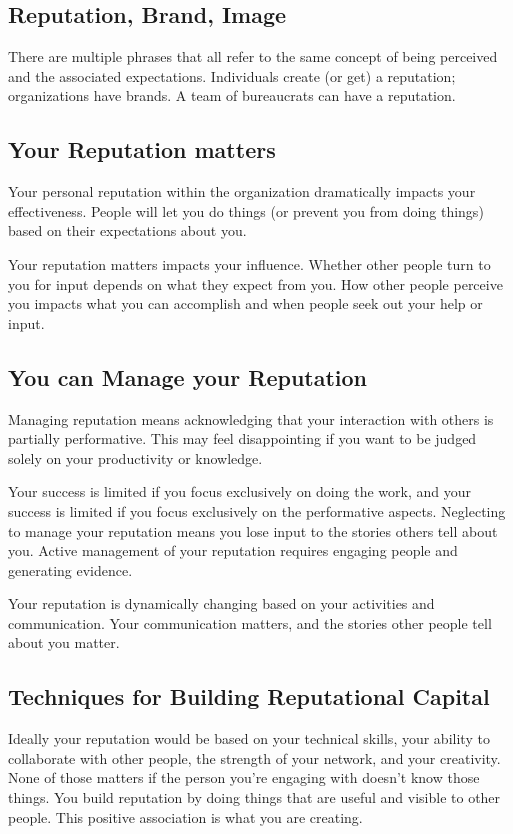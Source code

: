 \subsection*{Reputation, Brand, Image}

There are multiple phrases that all refer to the same concept of being perceived and the associated expectations. Individuals create (or get) a reputation; organizations have brands. A team of bureaucrats can have a reputation. 

\subsection*{Your Reputation matters}

Your personal reputation within the organization dramatically impacts your effectiveness. People will let you do things (or prevent you from doing things) based on their expectations about you. 

Your reputation matters impacts your influence. Whether other people turn to you for input depends on what they expect from you. How other people perceive you impacts what you can accomplish and when people seek out your help or input.

\subsection*{You can Manage your Reputation}

Managing reputation means acknowledging that your interaction with others is partially performative. This may feel disappointing if you want to be judged solely on your productivity or knowledge. 

Your success is limited if you focus exclusively on doing the work, and your success is limited if you focus exclusively on the performative aspects. 
Neglecting to manage your reputation means you lose input to the stories others tell about you. Active management of your reputation requires engaging people and generating evidence. 

Your reputation is dynamically changing based on your activities and communication. Your communication matters, and the stories other people tell about you matter.

\subsection*{Techniques for Building Reputational Capital}

Ideally your reputation would be based on your technical skills, your ability to collaborate with other people, the strength of your network, and your creativity. None of those matters if the person you're engaging with doesn't know those things. 
You build reputation by doing things that are useful and visible to other people. This positive association is what you are creating.

